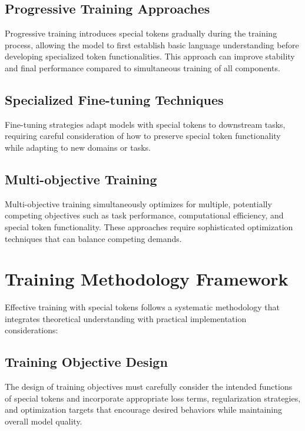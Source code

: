 \subsection{Progressive Training Approaches}

Progressive training introduces special tokens gradually during the training process, allowing the model to first establish basic language understanding before developing specialized token functionalities. This approach can improve stability and final performance compared to simultaneous training of all components.

\subsection{Specialized Fine-tuning Techniques}

Fine-tuning strategies adapt models with special tokens to downstream tasks, requiring careful consideration of how to preserve special token functionality while adapting to new domains or tasks.

\subsection{Multi-objective Training}

Multi-objective training simultaneously optimizes for multiple, potentially competing objectives such as task performance, computational efficiency, and special token functionality. These approaches require sophisticated optimization techniques that can balance competing demands.

\section{Training Methodology Framework}

Effective training with special tokens follows a systematic methodology that integrates theoretical understanding with practical implementation considerations:

\subsection{Training Objective Design}

The design of training objectives must carefully consider the intended functions of special tokens and incorporate appropriate loss terms, regularization strategies, and optimization targets that encourage desired behaviors while maintaining overall model quality.

